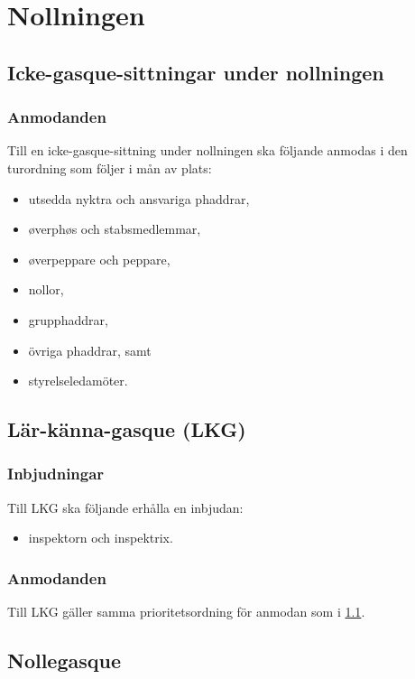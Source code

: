 \documentclass{dsekprotokoll}
\begin{document}
\section{Nollningen}

\subsection{Icke-gasque-sittningar under nollningen} \label{icke-gasque}

\subsubsection{Anmodanden}
Till en icke-gasque-sittning under nollningen ska följande
anmodas i den turordning som följer i mån av plats:

\begin{itemize}
    \item utsedda nyktra och ansvariga phaddrar,
    \item øverphøs och stabsmedlemmar,
    \item øverpeppare och peppare,
    \item nollor,
    \item grupphaddrar,
    \item övriga phaddrar, samt
    \item styrelseledamöter.
\end{itemize}

\subsection{Lär-känna-gasque (LKG)}

\subsubsection{Inbjudningar}
Till LKG ska följande erhålla en inbjudan:
\begin{itemize}
    \item inspektorn och inspektrix.
\end{itemize}

\subsubsection{Anmodanden}
Till LKG gäller samma prioritetsordning för anmodan som
i \ref{icke-gasque}.


\subsection{Nollegasque}
\end{document}
